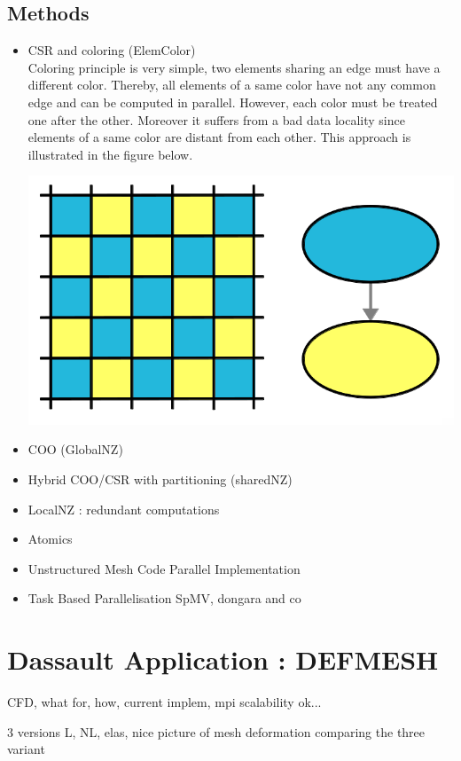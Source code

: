 \documentclass{IOS-Book-Article}
\begin{document}
\subsection{Methods}
\begin{itemize}
 \item CSR and coloring (ElemColor)\\
 Coloring principle is very simple, two elements sharing an edge must have a different color.
 Thereby, all elements of a same color have not any common edge and can be computed in parallel.
 However, each color must be treated one after the other. Moreover it suffers from a bad data locality since elements of a same color are distant from each other.
 This approach is illustrated in the figure below.
 \begin{center}
  \includegraphics[scale=0.25]{Coloring_approach.png}
 \end{center}
 \item COO (GlobalNZ)
 \item Hybrid COO/CSR with partitioning (sharedNZ)
 \item LocalNZ : redundant computations
 \item Atomics
 \item Unstructured Mesh Code Parallel Implementation
 \item Task Based Parallelisation SpMV, dongara and co \cite{MPI_task}
\end{itemize}

\section{Dassault Application : DEFMESH}

CFD, what for, how, current implem, mpi scalability ok...

3 versions L, NL, elas, nice picture of mesh deformation comparing the three variant
\end{document}
